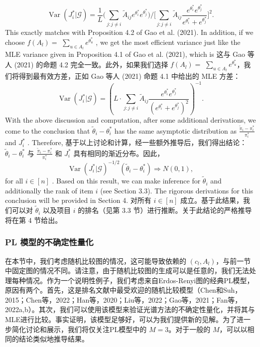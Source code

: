 $$
\operatorname {Var}(J_i^* |\mathcal{G}) = \frac{1}{L}\bigg(\sum_{j:j\neq i}\widetilde{A}_{ij}e^{\theta_i^*}e^{\theta_j^*}\bigg)\bigg / \bigg[\sum_{j:j\neq i}\widetilde{A}_{ij}\frac{e^{\theta_i^*}e^{\theta_j^*}}{e^{\theta_i^*} + e^{\theta_j^*}}\bigg]^2.
$$
This exactly matches with Proposition 4.2 of Gao et al. (2021). In addition, if we choose $f(A_{l}) =$ $\textstyle \sum_{u\in A_l}e^{\theta_u^*}$ , we get the most efficient variance just like the MLE variance given in Proposition 4.1 of Gao et al. (2021), which is
这与 Gao 等人 (2021) 的命题 4.2 完全一致。此外，如果我们选择 $f(A_{l}) =$ $\textstyle \sum_{u\in A_l}e^{\theta_u^*}$，我们将得到最有效方差，正如 Gao 等人 (2021) 命题 4.1 中给出的 MLE 方差：
$$
\operatorname {Var}(J_i^* |\mathcal{G}) = \left(L\cdot \sum_{j:j\neq i}\widetilde{A}_{ij}\frac{e^{\theta_i^*}e^{\theta_j^*}}{(e^{\theta_i^*} + e^{\theta_j^*})^2}\right)^{-1}.
$$
With the above discussion and computation, after some additional derivations, we come to the conclusion that $\widetilde{\theta}_{i} - \theta_{i}^{*}$ has the same asymptotic distribution as $\frac{\widetilde{\pi}_{i} - \pi_{i}^{*}}{\pi_{i}^{*}}$ and $J_{i}^{*}$ . Therefore,
基于以上讨论和计算，经一些额外推导后，我们得出结论：$\widetilde{\theta}_{i} - \theta_{i}^{*}$ 与 $\frac{\widetilde{\pi}_{i} - \pi_{i}^{*}}{\pi_{i}^{*}}$ 和 $J_{i}^{*}$ 具有相同的渐近分布。因此，
$$
\operatorname {Var}(J_i^* |\mathcal{G})^{-1 / 2}(\widetilde{\theta}_i - \theta_i^*)\Rightarrow N(0,1),
$$
for all $i\in [n]$ . Based on this result, we can make inference for $\widetilde{\theta}_{i}$ and additionally the rank of item $i$ (see Section 3.3). The rigorous derivations for this conclusion will be provided in Section 4.
对所有 $i\in [n]$ 成立。基于此结果，我们可以对 $\widetilde{\theta}_{i}$ 以及项目 $i$ 的排名（见第 3.3 节）进行推断。关于此结论的严格推导将在第 4 节给出。


\subsubsection{PL 模型的不确定性量化}

在本节中，我们考虑随机比较图的情况，这可能导致依赖的 $(c_l,A_l)$，与前一节中固定图的情况不同。请注意，由于随机比较图的生成可以是任意的，我们无法处理每种情况。作为一个说明性例子，我们考虑来自Erdos-Renyi图的经典PL模型，原因有两个。首先，这是排名文献中最受欢迎的随机比较模型（Chen和Suh，2015；Chen等，2022；Han等，2020；Liu等，2022；Gao等，2021；Fan等，2022a,b）。其次，我们可以使用该模型来验证光谱方法的不确定性量化，并将其与MLE进行比较。事实证明，该模型足够好，可以为我们提供新的见解。为了进一步简化讨论和展示，我们将仅关注PL模型中的 $M = 3$。对于一般的 $M$，可以以相同的结论类似地推导结果。

